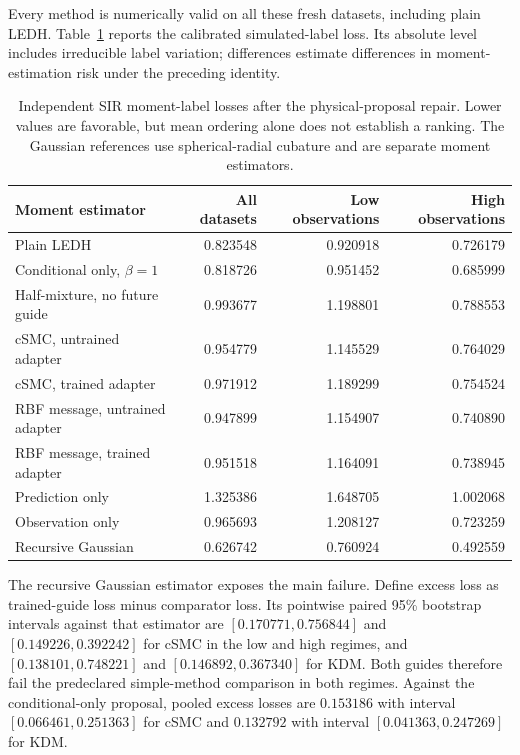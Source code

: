 Every method is numerically valid on all these fresh datasets, including
plain LEDH. Table~\ref{tab:sg-physical-risk} reports the calibrated
simulated-label loss. Its absolute level includes irreducible label
variation; differences estimate differences in moment-estimation risk
under the preceding identity.
\begin{table}[htbp]
\centering
\begin{tabular}{lrrr}
\toprule
Moment estimator & All datasets & Low observations & High observations\\
\midrule
Plain LEDH & 0.823548 & 0.920918 & 0.726179\\
Conditional only, \(\beta=1\) & 0.818726 & 0.951452 & 0.685999\\
Half-mixture, no future guide & 0.993677 & 1.198801 & 0.788553\\
cSMC, untrained adapter & 0.954779 & 1.145529 & 0.764029\\
cSMC, trained adapter & 0.971912 & 1.189299 & 0.754524\\
RBF message, untrained adapter & 0.947899 & 1.154907 & 0.740890\\
RBF message, trained adapter & 0.951518 & 1.164091 & 0.738945\\
Prediction only & 1.325386 & 1.648705 & 1.002068\\
Observation only & 0.965693 & 1.208127 & 0.723259\\
Recursive Gaussian & 0.626742 & 0.760924 & 0.492559\\
\bottomrule
\end{tabular}
\caption{Independent SIR moment-label losses after the physical-proposal
repair. Lower values are favorable, but mean ordering alone does not
establish a ranking. The Gaussian references use spherical-radial
cubature and are separate moment estimators.}
\label{tab:sg-physical-risk}
\end{table}

The recursive Gaussian estimator exposes the main failure. Define excess
loss as trained-guide loss minus comparator loss. Its pointwise paired
95\% bootstrap intervals against that estimator are
\([0.170771,0.756844]\) and \([0.149226,0.392242]\) for cSMC in the low
and high regimes, and \([0.138101,0.748221]\) and
\([0.146892,0.367340]\) for KDM. Both guides therefore fail the
predeclared simple-method comparison in both regimes. Against the
conditional-only proposal, pooled excess losses are \(0.153186\)
with interval \([0.066461,0.251363]\) for cSMC and \(0.132792\)
with interval \([0.041363,0.247269]\) for KDM.

